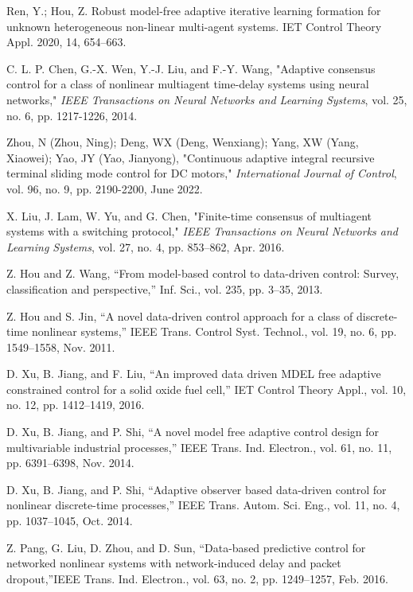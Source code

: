\documentclass[journal,onecolumn]{IEEEtran}
\begin{document}
\begin{thebibliography}{99}
    Ren, Y.; Hou, Z. Robust model-free adaptive iterative learning formation for unknown heterogeneous non-linear multi-agent systems. IET Control Theory Appl. 2020, 14, 654–663.
    
    C. L. P. Chen, G.-X. Wen, Y.-J. Liu, and F.-Y. Wang, "Adaptive consensus control for a class of nonlinear multiagent time-delay systems using neural networks," \textit{IEEE Transactions on Neural Networks and Learning Systems}, vol. 25, no. 6, pp. 1217-1226, 2014.
    
    Zhou, N (Zhou, Ning); Deng, WX (Deng, Wenxiang); Yang, XW (Yang, Xiaowei); Yao, JY (Yao, Jianyong), "Continuous adaptive integral recursive terminal sliding mode control for DC motors," \textit{International Journal of Control}, vol. 96, no. 9, pp. 2190-2200, June 2022.
    
    X. Liu, J. Lam, W. Yu, and G. Chen, "Finite-time consensus of multiagent systems with a switching protocol," \emph{IEEE Transactions on Neural Networks and Learning Systems}, vol. 27, no. 4, pp. 853–862, Apr. 2016.

    Z. Hou and Z. Wang, “From model-based control to data-driven control:
    Survey, classification and perspective,” Inf. Sci., vol. 235, pp. 3–35, 2013.

    Z. Hou and S. Jin, “A novel data-driven control approach for a class
    of discrete-time nonlinear systems,” IEEE Trans. Control Syst. Technol.,
    vol. 19, no. 6, pp. 1549–1558, Nov. 2011.

    D. Xu, B. Jiang, and F. Liu, “An improved data driven MDEL free adaptive
    constrained control for a solid oxide fuel cell,” IET Control Theory Appl.,
    vol. 10, no. 12, pp. 1412–1419, 2016.

    D. Xu, B. Jiang, and P. Shi, “A novel model free adaptive control design
    for multivariable industrial processes,” IEEE Trans. Ind. Electron., vol. 61,
    no. 11, pp. 6391–6398, Nov. 2014.

    D. Xu, B. Jiang, and P. Shi, “Adaptive observer based data-driven control
    for nonlinear discrete-time processes,” IEEE Trans. Autom. Sci. Eng.,
    vol. 11, no. 4, pp. 1037–1045, Oct. 2014.

    Z. Pang, G. Liu, D. Zhou, and D. Sun, “Data-based predictive control for networked nonlinear systems with network-induced delay and packet dropout,”IEEE Trans. Ind. Electron., vol. 63, no. 2, pp. 1249–1257,
    Feb. 2016.


\end{thebibliography}
\end{document}

